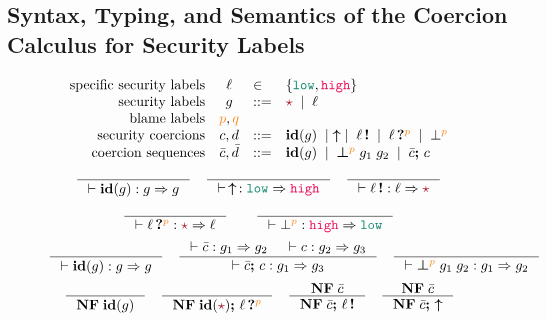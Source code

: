\subsection{Syntax, Typing, and Semantics of the Coercion Calculus for Security Labels}
\label{sec:coercion-calc-def}

\begin{figure}[tbp]
\raggedright
  \[
  \begin{array}{rcll}
    \text{specific security labels} & \ell & \in & \{ \low , \high \} \\
    \text{security labels}  & g    & ::= & \unk \MID \ell \\
    \text{blame labels}         & \bl{p}, \bl{q}     &      & \\
    \text{security coercions}            & c, d     & ::=  & \id{g} \MID \up \MID \inj{\ell} \MID \proj{\ell}{p} \MID \bot^{\bl{p}} \\
    \text{coercion sequences} & \bar{c}, \bar{d} & ::=  & \id{g} \MID \err{g_1}{g_2}{p} \MID \bar{c} \seq c
  \end{array}
  \]
  {\small
  \begin{gather*}
    \inference{}{\vdash \id{g} : g \Rightarrow g}
    \quad
    \inference{}
              {\vdash \,\up\, : \low \Rightarrow \high}
    \quad
    \inference{}
              {\vdash \inj{\ell} : \ell \Rightarrow \unk}
    \\[1ex]
    \inference{}
              {\vdash \proj{\ell}{p} : \unk \Rightarrow \ell}
    \qquad
    \inference{}
              {\vdash \bot^{\bl{p}} : \high \Rightarrow \low}
  \end{gather*}}
  {\small
  \begin{gather*}
    \inference{}{\vdash \id{g} : g \Rightarrow g}
    \quad
    \inference{\vdash \bar{c} : g_1 \Rightarrow g_2 & \vdash c : g_2 \Rightarrow g_3}
              {\vdash \bar{c} \seq c : g_1 \Rightarrow g_3}
    \quad
    \inference{}
              {\vdash \err{g_1}{g_2}{p} : g_1 \Rightarrow g_2}
  \end{gather*}}
  {\small
  \begin{gather*}
  \inference{}{\mathbf{NF}\; \id{g}}
  \quad
  \inference{}{\mathbf{NF}\; \id{\unk} \seq \proj{\ell}{p}}
  \quad
  \inference{\mathbf{NF}\; \bar{c}}{\mathbf{NF}\; \bar{c}\seq\inj{\ell}}
  \quad
  \inference{\mathbf{NF}\; \bar{c}}{\mathbf{NF}\; \bar{c}\seq\up}
  \end{gather*}}

\end{figure}
